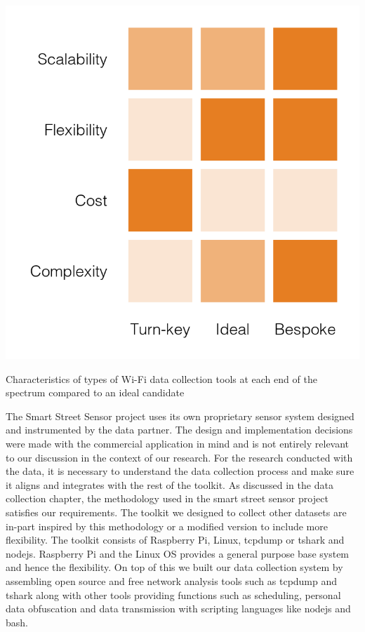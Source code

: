 \begin{marginfigure}
  \includegraphics[trim={0.2cm 0 0 0},clip]{images/data-toolkit-collection.png}
  \caption{Characteristics of types of Wi-Fi data collection tools at each end of the spectrum compared to an ideal candidate  }
  \label{figure:toolkit:collection}
\end{marginfigure}

The Smart Street Sensor project uses its own proprietary sensor system designed and instrumented by the data partner.
The design and implementation decisions were made with the commercial application in mind and is not entirely relevant to our discussion in the context of our research.
For the research conducted with the data, it is necessary to understand the data collection process and make sure it aligns and integrates with the rest of the toolkit.
As discussed in the data collection chapter, the methodology used in the smart street sensor project satisfies our requirements.
The toolkit we designed to collect other datasets are in-part inspired by this methodology or a modified version to include more flexibility.
The toolkit consists of Raspberry Pi, Linux, tcpdump or tshark \cite{wireshark2} and nodejs.
Raspberry Pi and the Linux OS provides a general purpose base system and hence the flexibility.
On top of this we built our data collection system by assembling open source and free network analysis tools such as tcpdump and tshark along with other tools providing functions such as scheduling, personal data obfuscation and data transmission with scripting languages like nodejs and bash.

